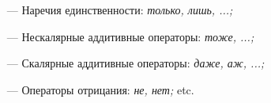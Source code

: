 \documentclass[a4paper, titlepage, 12pt]{article}
\begin{document}
\begin{itemize}\setlength\itemsep{0em}
    \item[---] Наречия единственности: \textit{только,  лишь, ...;}
    \item[---] Нескалярные аддитивные операторы: \textit{тоже, ...;}
    \item[---] Скалярные аддитивные операторы: \textit{даже, аж, ...;}
    \item[---] Операторы отрицания: \textit{не, нет;} etc.
\end{itemize}

\newpage
 

\end{document}
